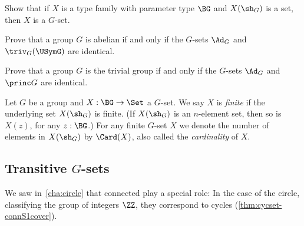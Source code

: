 \begin{xca}
Show that if $X$ is a type family with parameter type $\BG$ and $X(\sh_G)$ is a set,
then $X$ is a $G$-set.
\end{xca}

\begin{xca}\label{xca:Ad-triv-abelian}
  Prove that a group $G$ is abelian if and only if the $G$-sets $\Ad_G$ and
  $\triv_G(\USymG)$ are identical.
\end{xca}

\begin{xca}\label{xca:Ad-princ-trivial}
  Prove that a group $G$ is the trivial group if and only if the $G$-sets $\Ad_G$ and
  $\princ G$ are identical.
\end{xca}

\begin{definition}\label{def:finite-G-set}
Let $G$ be a group and $X:\BG\to\Set$ a $G$-set.
We say $X$ is \emph{finite} if the underlying set $X(\sh_G)$ is finite.
(If $X(\sh_G)$ is an $n$-element set, then so is $X(z)$, for any $z:\BG$.)
For any finite $G$-set $X$ we denote the number of elements
in $X(\sh_G)$ by $\Card(X)$, also called the \emph{cardinality} of $X$.
\end{definition}

\subsection{Transitive $G$-sets}
\label{sec:transitiveGsets}
We saw in~\cref{cha:circle} that connected \coverings play a special role:
In the case of the circle, classifying the group of integers $\ZZ$,
they correspond to cycles (\cref{thm:cycset-connS1cover}).

